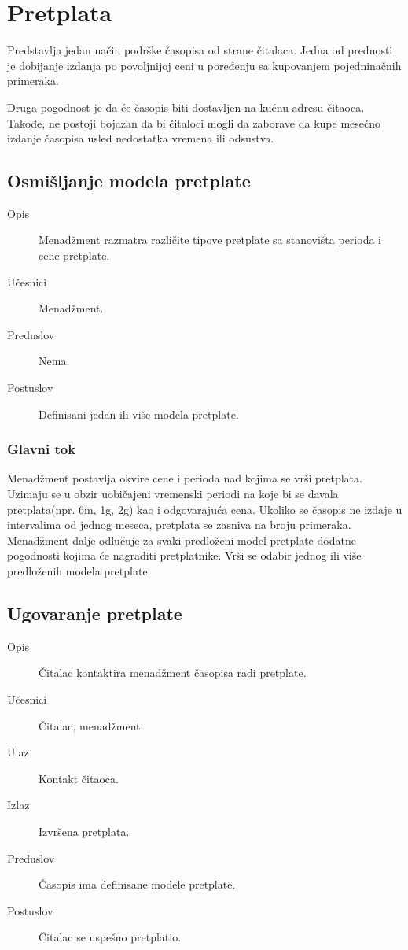 \section{Pretplata}
Predstavlja jedan način podrške časopisa od strane čitalaca. Jedna od prednosti je dobijanje izdanja po povoljnijoj ceni u poređenju sa kupovanjem pojedninačnih primeraka. 

Druga pogodnost je da će časopis biti dostavljen na kućnu adresu čitaoca. Takođe, ne postoji bojazan da bi čitaloci mogli da zaborave da kupe mesečno izdanje časopisa usled nedostatka vremena ili odsustva.

\subsection{Osmišljanje modela pretplate}
\begin{description}
\item [Opis] Menadžment razmatra različite tipove pretplate sa stanovišta perioda i cene pretplate.
\item [Učesnici] Menadžment.
\item [Preduslov] Nema.
\item [Postuslov] Definisani jedan ili više modela pretplate.
\end{description}
\subsubsection{Glavni tok}
Menadžment postavlja okvire cene i perioda nad kojima se vrši pretplata. Uzimaju se u obzir uobičajeni vremenski periodi na koje bi se davala pretplata(npr. 6m, 1g, 2g) kao i odgovarajuća cena.
Ukoliko se časopis ne izdaje u intervalima od jednog meseca, pretplata se zasniva na broju primeraka. Menadžment dalje odlučuje za svaki predloženi model pretplate dodatne pogodnosti kojima će nagraditi pretplatnike.
Vrši se odabir jednog ili više predloženih modela pretplate.

\subsection{Ugovaranje pretplate}
\begin{description}
\item [Opis] Čitalac kontaktira menadžment časopisa radi pretplate.
\item [Učesnici] Čitalac, menadžment.
\item [Ulaz] Kontakt čitaoca.
\item [Izlaz] Izvršena pretplata.
\item [Preduslov] Časopis ima definisane modele pretplate.
\item [Postuslov] Čitalac se uspešno pretplatio.
\end{description}
